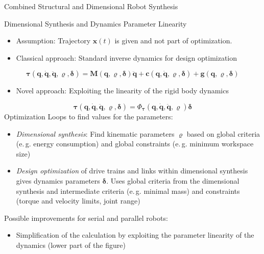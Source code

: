 \documentclass[c]{beamer}
\begin{document}
\begin{frame}
\begin{block}{Combined Structural and Dimensional Robot Synthesis}
{\begin{multicols}{2}
\end{multicols}}
\end{block}
\begin{whiteblock}{Dimensional Synthesis and Dynamics Parameter Linearity}
\parbox{\linewidth}{
\begin{multicols}{2}
\begin{itemize}
    \item Assumption: Trajectory $\bm{x}(t)$ is given and not part of optimization.
    \item Classical approach: Standard inverse dynamics for design optimization
\end{itemize}
\begin{equation}
\bm{\tau}(\bm{q},\dot{\bm{q}},\ddot{\bm{q}},\bm{\varrho},\bm{\delta})
= 
\bm{M}(\bm{q},\bm{\varrho},\bm{\delta}) \ddot{\bm{q}}
+ \bm{c}(\bm{q},\dot{\bm{q}},\bm{\varrho},\bm{\delta})
+ \bm{g}(\bm{q},\bm{\varrho},\bm{\delta})
\label{equ:invdyn_std}
\end{equation}
\vspace{-1.5cm} %
\begin{itemize}
    \item Novel approach: Exploiting the linearity of the rigid body dynamics
\end{itemize}
\begin{equation}
\bm{\tau}(\bm{q},\dot{\bm{q}},\ddot{\bm{q}},\bm{\varrho},\bm{\delta})
=
\bm{\varPhi}_{\bm{\tau}}(\bm{q},\dot{\bm{q}},\ddot{\bm{q}},\bm{\varrho}) \bm{\delta}
\label{equ:invdyn_plin}
\end{equation}
Optimization Loops to find values for the parameters:
\begin{itemize}
    \item \emph{Dimensional synthesis}: Find kinematic parameters $\bm{\varrho}$ based on global criteria (e.\,g. energy consumption) and global constraints (e.\,g. minimum workspace size)
    \item \emph{Design optimization} of drive trains and links within dimensional synthesis gives dynamics parameters $\bm{\delta}$. Uses global criteria from the dimensional synthesis and intermediate criteria (e.\,g. minimal mass) and constraints (torque and velocity limits, joint range)
\end{itemize}
Possible improvements for serial and parallel robots:
\begin{itemize}
    \item Simplification of the calculation by exploiting the parameter linearity of the dynamics (lower part of the figure)

\end{itemize}
\end{multicols}}
\end{whiteblock}
\end{frame}
\end{document}
